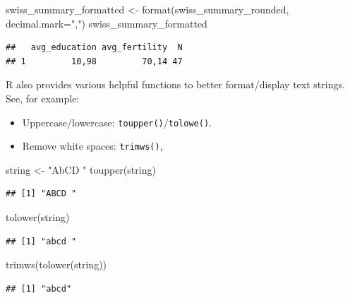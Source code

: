 \documentclass[
  12pt,
]{style/krantz}
\newenvironment{Shaded}{\begin{snugshade}}{\end{snugshade}}
\newcommand{\AttributeTok}[1]{\textcolor[rgb]{0.77,0.63,0.00}{#1}}
\newcommand{\FunctionTok}[1]{\textcolor[rgb]{0.00,0.00,0.00}{#1}}
\newcommand{\NormalTok}[1]{#1}
\newcommand{\OtherTok}[1]{\textcolor[rgb]{0.56,0.35,0.01}{#1}}
\newcommand{\StringTok}[1]{\textcolor[rgb]{0.31,0.60,0.02}{#1}}
\providecommand{\tightlist}{%
  \setlength{\itemsep}{0pt}\setlength{\parskip}{0pt}}
\begin{document}
\begin{Shaded}
\begin{Highlighting}[]
\NormalTok{swiss\_summary\_formatted }\OtherTok{\textless{}{-}} \FunctionTok{format}\NormalTok{(swiss\_summary\_rounded, }\AttributeTok{decimal.mark=}\StringTok{","}\NormalTok{)}
\NormalTok{swiss\_summary\_formatted}
\end{Highlighting}
\end{Shaded}

\begin{verbatim}
##   avg_education avg_fertility  N
## 1         10,98         70,14 47
\end{verbatim}

R also provides various helpful functions to better format/display text strings. See, for example:

\begin{itemize}
\tightlist
\item
  Uppercase/lowercase: \texttt{toupper()}/\texttt{tolowe()}.
\item
  Remove white spaces: \texttt{trimws()},
\end{itemize}

\begin{Shaded}
\begin{Highlighting}[]
\NormalTok{string }\OtherTok{\textless{}{-}} \StringTok{"AbCD "}
\FunctionTok{toupper}\NormalTok{(string)}
\end{Highlighting}
\end{Shaded}

\begin{verbatim}
## [1] "ABCD "
\end{verbatim}

\begin{Shaded}
\begin{Highlighting}[]
\FunctionTok{tolower}\NormalTok{(string)}
\end{Highlighting}
\end{Shaded}

\begin{verbatim}
## [1] "abcd "
\end{verbatim}

\begin{Shaded}
\begin{Highlighting}[]
\FunctionTok{trimws}\NormalTok{(}\FunctionTok{tolower}\NormalTok{(string))}
\end{Highlighting}
\end{Shaded}

\begin{verbatim}
## [1] "abcd"
\end{verbatim}
\end{document}
